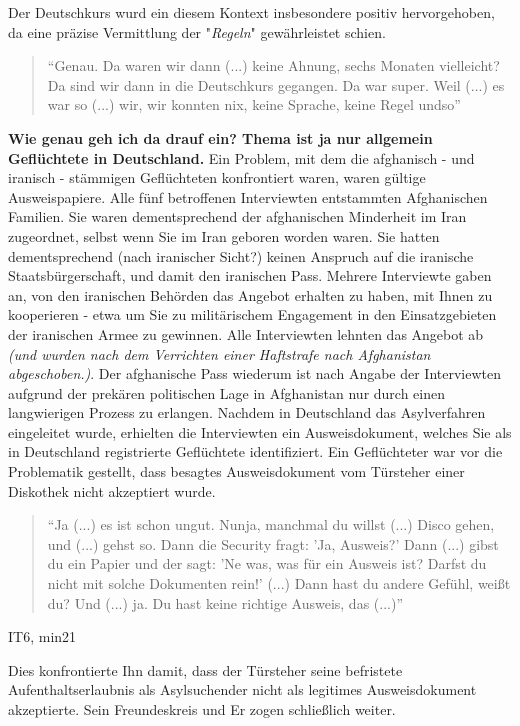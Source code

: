 Der Deutschkurs wurd ein diesem Kontext insbesondere positiv hervorgehoben, da eine präzise Vermittlung der "\textit{Regeln}" gewährleistet schien.
\begin{quote}
    ``Genau. Da waren wir dann (...) keine Ahnung, sechs Monaten vielleicht? Da sind wir dann in die Deutschkurs gegangen. Da war super. Weil (...) es war so (...) wir, wir konnten nix, keine Sprache, keine Regel undso''
\end{quote}
\textbf{Wie genau geh ich da drauf ein? Thema ist ja nur allgemein Geflüchtete in Deutschland.}
Ein Problem, mit dem die afghanisch - und iranisch - stämmigen Geflüchteten konfrontiert waren, waren gültige Ausweispapiere.\newline
Alle fünf betroffenen Interviewten entstammten Afghanischen Familien. Sie waren dementsprechend der afghanischen Minderheit im Iran zugeordnet, selbst wenn Sie im Iran geboren worden waren. Sie hatten dementsprechend (nach iranischer Sicht?) keinen Anspruch auf die iranische Staatsbürgerschaft, und damit den iranischen Pass.\newline
Mehrere Interviewte gaben an, von den iranischen Behörden das Angebot erhalten zu haben, mit Ihnen zu kooperieren - etwa um Sie zu militärischem Engagement in den Einsatzgebieten der iranischen Armee zu gewinnen. Alle Interviewten lehnten das Angebot ab \textit{(und wurden nach dem Verrichten einer Haftstrafe nach Afghanistan abgeschoben.)}. 
Der afghanische Pass wiederum ist nach Angabe der Interviewten aufgrund der prekären politischen Lage in Afghanistan nur durch einen langwierigen Prozess zu erlangen.\newline
Nachdem in Deutschland das Asylverfahren eingeleitet wurde, erhielten die Interviewten ein Ausweisdokument, welches Sie als in Deutschland registrierte Geflüchtete identifiziert. Ein Geflüchteter war vor die Problematik gestellt, dass besagtes Ausweisdokument vom Türsteher einer Diskothek nicht akzeptiert wurde.
\begin{quote}
    ``Ja (...) es ist schon ungut. Nunja, manchmal du willst (...) Disco gehen, und (...) gehst so. Dann die Security fragt: 'Ja, Ausweis?' Dann (...) gibst du ein Papier und der sagt: 'Ne was, was für ein Ausweis ist? Darfst du nicht mit solche Dokumenten rein!' (...) Dann hast du andere Gefühl, weißt du? Und (...) ja. Du hast keine richtige Ausweis, das (...)''
\end{quote}
\caption{IT6, min21}
Dies konfrontierte Ihn damit, dass der Türsteher seine befristete Aufenthaltserlaubnis als Asylsuchender nicht als legitimes Ausweisdokument akzeptierte. Sein Freundeskreis und Er zogen schließlich weiter.


